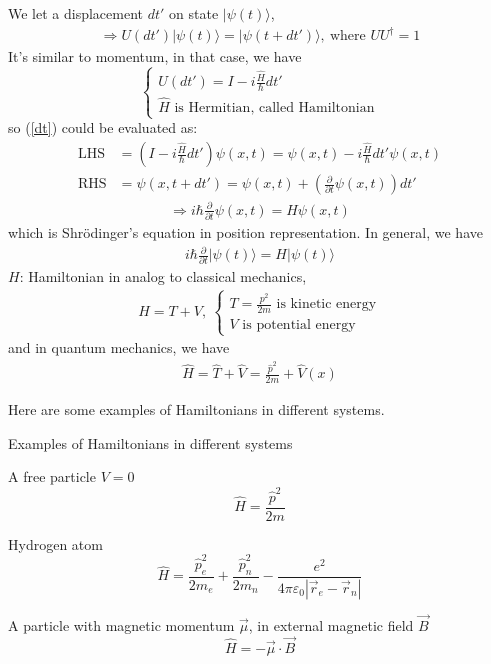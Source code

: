 \documentclass[UTF8,12pt]{article} %
\numberwithin{equation}{section}
\begin{document}
We let a displacement $dt'$ on state $|\psi(t)\rangle$,
\begin{align}\label{dt}
\Rightarrow U(dt')|\psi(t)\rangle = |\psi(t+dt')\rangle,~\text{where } UU^{\dag} = 1
\end{align}
It's similar to momentum, in that case, we have
$$\begin{cases}U(dt') = I - i\frac{\hat{H}}{\hbar}dt'\\\hat{H} \text{ is Hermitian, called Hamiltonian}\end{cases}$$
so (\ref{dt}) could be evaluated as:
\begin{align}
\text{LHS} &= \left(I - i\frac{\hat{H}}{\hbar}dt'\right) \psi(x,t) = \psi(x,t) -  i\frac{\hat{H}}{\hbar}dt'\psi(x,t) \\
\text{RHS} &= \psi(x,t+dt') = \psi(x,t) + \left(\frac{\partial}{\partial t}\psi(x,t)\right)dt'
\end{align}
\begin{align}
\Rightarrow \boxed{i\hbar\frac{\partial}{\partial t} \psi(x,t) = H\psi(x,t)}
\end{align}
which is Shr\"{o}dinger's equation in position representation. In general, we have
\begin{align}\label{shordinger}
\boxed{i\hbar\frac{\partial}{\partial t} |\psi(t)\rangle = H|\psi(t)\rangle}
\end{align}
$H$: Hamiltonian in analog to classical mechanics,
\begin{align}
H = T + V,~ \begin{cases}T = \frac{p^{2}}{2m} \text{ is kinetic energy} \\ V \text{ is potential energy}\end{cases}
\end{align}
and in quantum mechanics, we have
\begin{align}
\hat{H} = \hat{T} + \hat{V} = \frac{\hat{p}^{2}}{2m} + \hat{V}(x)
\end{align}

Here are some examples of Hamiltonians in different systems.

\begin{myboxes}{Examples of Hamiltonians in different systems}{}
\begin{enumerate*}
\item A free particle $V=0$ $$\hat{H} = \frac{\hat{p}^{2}}{2m}$$
\item Hydrogen atom $$\hat{H} = \frac{\hat{p}_{e}^{2}}{2m_{e}} + \frac{\hat{p}_{n}^{2}}{2m_{n}} - \frac{e^{2}}{4\pi\varepsilon_{0}|\vec{r}_{e}-\vec{r}_{n}|}$$
\item A particle with magnetic momentum $\vec{\mu}$, in external magnetic field $\vec{B}$
$$\hat{H} = -\vec{\mu}\cdot\vec{B}$$
\end{enumerate*}
\end{myboxes}
\end{document}
